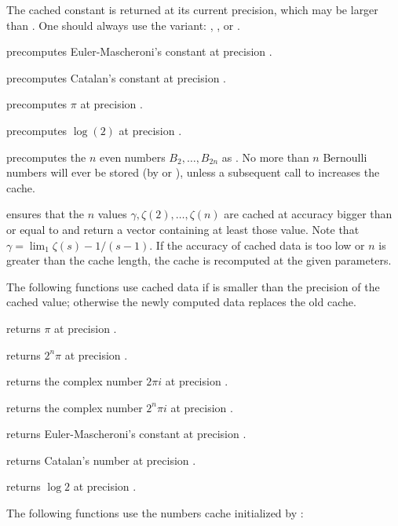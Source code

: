 The cached constant is returned at its current precision, which may be larger
than . One should always use the  variant:
, , or .

 precomputes Euler-Mascheroni's constant
at precision .

 precomputes Catalan's constant at precision
.

 precomputes $\pi$ at precision .

 precomputes $\log(2)$ at precision
.

 precomputes the $n$ even  numbers
$B_2,\dots,B_{2n}$ as . No more than $n$ Bernoulli numbers will
ever be stored (by  or ), unless a subsequent
call to  increases the cache.

 ensures that the $n$ values
$\gamma, \zeta(2),\dots, \zeta(n)$ are cached at accuracy bigger than or equal
to  and return a vector containing at least those value. Note that
$\gamma = \lim_1 \zeta(s) - 1/(s-1)$. If the accuracy of cached data is too
low or $n$ is greater than the cache length, the cache is recomputed at the
given parameters.

The following functions use cached data if  is smaller than the
precision of the cached value; otherwise the newly computed data replaces the
old cache.

 returns $\pi$ at precision .

 returns $2^n\pi$ at precision .

 returns the complex number $2\pi i$ at
precision .

 returns the complex number $2^n\pi i$ at
precision .

 returns Euler-Mascheroni's constant at
precision .

 returns Catalan's number at precision .

 returns $\log 2$ at precision .

The following functions use the  numbers cache initialized by
:

